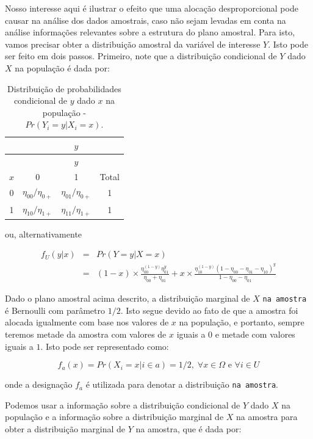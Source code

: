 \documentclass[]{book}
\theoremstyle{definition}
\theoremstyle{definition}
\theoremstyle{definition}
\theoremstyle{remark}
\begin{document}
Nosso interesse aqui é ilustrar o efeito que uma alocação
desproporcional pode causar na análise dos dados amostrais, caso não
sejam levadas em conta na análise informações relevantes sobre a
estrutura do plano amostral. Para isto, vamos precisar obter a
distribuição amostral da variável de interesse \(Y\). Isto pode ser
feito em dois passos. Primeiro, note que a distribuição condicional de
\(Y\) dado \(X\) na população é dada por:

\begin{longtable}[]{@{}cccc@{}}
\caption{\label{tab:Tab25} Distribuição de probabilidades condicional de
\(y\) dado \(x\) na população -
\(Pr( Y_i = y | X_i = x )\).}\tabularnewline
\toprule
& & \(y\) &\tabularnewline
\midrule
\endfirsthead
\toprule
& & \(y\) &\tabularnewline
\midrule
\endhead
\(x\) & 0 & 1 & Total\tabularnewline
0 & \(\eta_{00}/\eta_{0+}\) & \(\eta_{01}/\eta_{0+}\) & 1\tabularnewline
1 & \(\eta_{10}/\eta_{1+}\) & \(\eta_{11}/\eta_{1+}\) & 1\tabularnewline
\bottomrule
\end{longtable}

ou, alternativamente

\begin{eqnarray}
 f_U (y | x) &=& Pr( Y = y | X = x )\\
             & =& (1-x) \times \frac{\eta_{00}^{(1-y)} \eta_{01}^y}   {\eta_{00}+\eta_{01}} + x \times \frac{\eta_{10}^{(1-y)} (1 - \eta_{00} - \eta_{01} - \eta_{10})^y} {1 - \eta_{00} - \eta_{01}}\nonumber
\end{eqnarray}

Dado o plano amostral acima descrito, a distribuição marginal de \(X\)
\texttt{na\ amostra} é Bernoulli com parâmetro \(1/2\). Isto segue
devido ao fato de que a amostra foi alocada igualmente com base nos
valores de \(x\) na população, e portanto, sempre teremos metade da
amostra com valores de \(x\) iguais a \(0\) e metade com valores iguais
a \(1\). Isto pode ser representado como:

\begin{equation}
 f_a (x) = Pr( X_i = x | i \in a ) = 1 / 2,\; \forall x \in \Omega \mbox{ e } \forall i \in U
\end{equation}

onde a designação \(f_a\) é utilizada para denotar a distribuição
\texttt{na\ amostra}.

Podemos usar a informação sobre a distribuição condicional de \(Y\) dado
\(X\) na população e a informação sobre a distribuição marginal de \(X\)
na amostra para obter a distribuição marginal de \(Y\) na amostra, que é
dada por:
\end{document}
